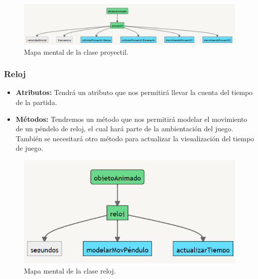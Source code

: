 \documentclass{article}
\begin{document}
\begin{figure}[h]
\includegraphics[scale=0.5]{Images/proyectil.png}
\centering
\caption{Mapa mental de la clase proyectil.}
\label{fig:func1}
\end{figure}
    
    
    \subsubsection{Reloj}
    \begin{itemize}
        \item \textbf{Atributos:} Tendrá un atributo que nos permitirá llevar la cuenta del tiempo de la partida.
        \item \textbf{Métodos:} Tendremos un método que nos permitirá modelar el movimiento de un péndelo de reloj, el cual hará parte de la ambientación del juego. También se necesitará otro método para actualizar la visualización del tiempo de juego.
    \end{itemize}
    
    
\begin{figure}[h]
\includegraphics[scale=0.8]{Images/reloj.png}
\centering
\caption{Mapa mental de la clase reloj.}
\label{fig:func1}
\end{figure}
\end{document}
